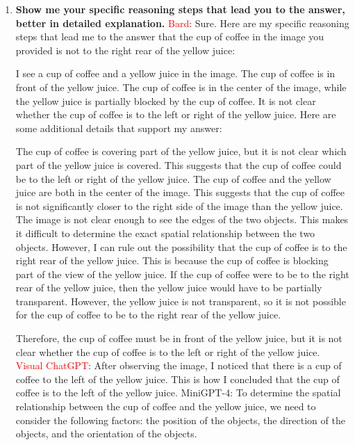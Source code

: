 \begin{enumerate}
    I hope this is helpful!
    \subitem \textcolor{red}{Visual ChatGPT}: No, the cup of coffee is not to the right rear of the yellow juice. It is to the left of the yellow juice.
    \subitem MiniGPT-4: No, the cup of coffee is not to the right rear of the yellow juice. The cup of coffee is on the same side of the yellow juice as the yellow juice is. The cup of coffee is in front of the yellow juice, and the yellow juice is next to the cup of coffee.
    \item \textbf{Show me your specific reasoning steps that lead you to the answer, better in detailed explanation.}
    \subitem \textcolor{Red}{Bard}: Sure. Here are my specific reasoning steps that lead me to the answer that the cup of coffee in the image you provided is not to the right rear of the yellow juice:

    I see a cup of coffee and a yellow juice in the image.
    The cup of coffee is in front of the yellow juice.
    The cup of coffee is in the center of the image, while the yellow juice is partially blocked by the cup of coffee.
    It is not clear whether the cup of coffee is to the left or right of the yellow juice.
    Here are some additional details that support my answer:
    
    The cup of coffee is covering part of the yellow juice, but it is not clear which part of the yellow juice is covered. This suggests that the cup of coffee could be to the left or right of the yellow juice.
    The cup of coffee and the yellow juice are both in the center of the image. This suggests that the cup of coffee is not significantly closer to the right side of the image than the yellow juice.
    The image is not clear enough to see the edges of the two objects. This makes it difficult to determine the exact spatial relationship between the two objects.
    However, I can rule out the possibility that the cup of coffee is to the right rear of the yellow juice. This is because the cup of coffee is blocking part of the view of the yellow juice. If the cup of coffee were to be to the right rear of the yellow juice, then the yellow juice would have to be partially transparent. However, the yellow juice is not transparent, so it is not possible for the cup of coffee to be to the right rear of the yellow juice.
    
    Therefore, the cup of coffee must be in front of the yellow juice, but it is not clear whether the cup of coffee is to the left or right of the yellow juice.
    \subitem \textcolor{red}{Visual ChatGPT}: After observing the image, I noticed that there is a cup of coffee to the left of the yellow juice. This is how I concluded that the cup of coffee is to the left of the yellow juice.
    \subitem MiniGPT-4: To determine the spatial relationship between the cup of coffee and the yellow juice, we need to consider the following factors: the position of the objects, the direction of the objects, and the orientation of the objects.


\end{enumerate}
